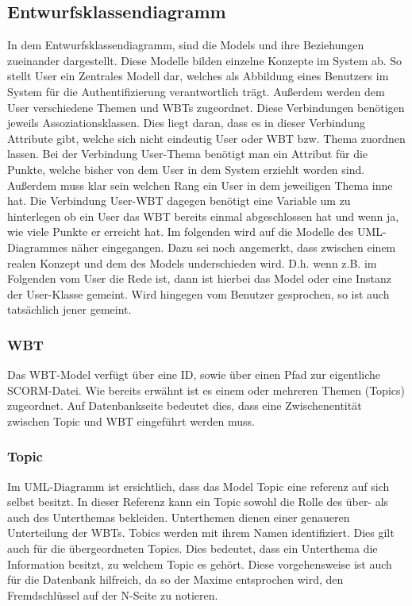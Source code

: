 \subsection{Entwurfsklassendiagramm}
In dem Entwurfsklassendiagramm, sind die Models und ihre Beziehungen zueinander
dargestellt. Diese Modelle bilden einzelne Konzepte im System ab. So stellt User
ein Zentrales Modell dar, welches als Abbildung eines Benutzers im System für
die Authentifizierung verantwortlich trägt. Außerdem werden dem User
verschiedene Themen und WBTs zugeordnet. Diese Verbindungen benötigen jeweils
Assoziationsklassen. Dies liegt daran, dass es in dieser Verbindung Attribute
gibt, welche sich nicht eindeutig User oder WBT bzw. Thema zuordnen lassen. Bei
der Verbindung User-Thema benötigt man ein Attribut für die Punkte, welche
bisher von dem User in dem System erziehlt worden sind. Außerdem muss klar sein
welchen Rang ein User in dem jeweiligen Thema inne hat. Die Verbindung User-WBT
dagegen benötigt eine Variable um zu hinterlegen ob ein User das WBT bereits
einmal abgeschlossen hat und wenn ja, wie viele Punkte er erreicht hat. Im folgenden
wird auf die Modelle des UML-Diagrammes näher eingegangen. Dazu sei noch
angemerkt, dass zwischen einem realen Konzept und dem des Models underschieden
wird. D.h. wenn z.B. im Folgenden vom User die Rede ist, dann ist hierbei das
Model oder eine Instanz der User-Klasse gemeint. Wird hingegen vom Benutzer
gesprochen, so ist auch tatsächlich jener gemeint.  

\subsubsection{WBT}\label{ref:objectWBT}
Das WBT-Model verfügt über eine ID, sowie über einen Pfad zur eigentliche
SCORM-Datei. Wie bereits erwähnt ist es einem oder mehreren Themen (Topics)
zugeordnet. Auf Datenbankseite bedeutet dies, dass eine Zwischenentität zwischen
Topic und WBT eingeführt werden muss. 

\subsubsection{Topic}
Im UML-Diagramm ist ersichtlich, dass das Model Topic eine referenz auf sich
selbst besitzt. In dieser Referenz kann ein Topic sowohl die Rolle des über- als
auch des Unterthemas bekleiden. Unterthemen dienen einer genaueren Unterteilung
der WBTs. Tobics werden mit ihrem Namen identifiziert. Dies gilt auch für die
übergeordneten Topics. Dies bedeutet, dass ein Unterthema die Information
besitzt, zu welchem Topic es gehört. Diese vorgehensweise ist auch für die
Datenbank hilfreich, da so der Maxime entsprochen wird, den Fremdschlüssel auf
der N-Seite zu notieren.

